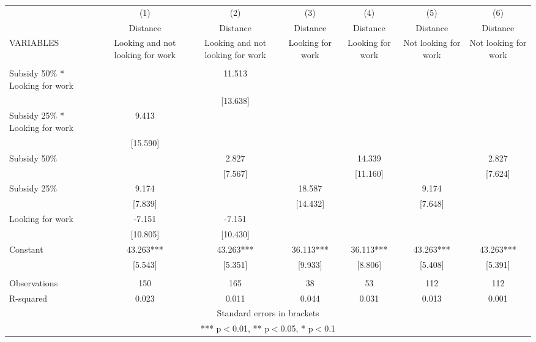 \documentclass[]{article}
\begin{document}
\begin{tabular}{lcccccc} \hline
 & (1) & (2) & (3) & (4) & (5) & (6) \\
 & Distance & Distance & Distance & Distance & Distance & Distance \\
VARIABLES & Looking and not looking for work & Looking and not looking for work & Looking for work & Looking for work & Not looking for work & Not looking for work \\ \hline
 &  &  &  &  &  &  \\
Subsidy 50\% * Looking for work &  & 11.513 &  &  &  &  \\
 &  & [13.638] &  &  &  &  \\
Subsidy 25\% * Looking for work & 9.413 &  &  &  &  &  \\
 & [15.590] &  &  &  &  &  \\
Subsidy 50\% &  & 2.827 &  & 14.339 &  & 2.827 \\
 &  & [7.567] &  & [11.160] &  & [7.624] \\
Subsidy 25\% & 9.174 &  & 18.587 &  & 9.174 &  \\
 & [7.839] &  & [14.432] &  & [7.648] &  \\
Looking for work & -7.151 & -7.151 &  &  &  &  \\
 & [10.805] & [10.430] &  &  &  &  \\
Constant & 43.263*** & 43.263*** & 36.113*** & 36.113*** & 43.263*** & 43.263*** \\
 & [5.543] & [5.351] & [9.933] & [8.806] & [5.408] & [5.391] \\
 &  &  &  &  &  &  \\
Observations & 150 & 165 & 38 & 53 & 112 & 112 \\
 R-squared & 0.023 & 0.011 & 0.044 & 0.031 & 0.013 & 0.001 \\ \hline
\multicolumn{7}{c}{ Standard errors in brackets} \\
\multicolumn{7}{c}{ *** p$<$0.01, ** p$<$0.05, * p$<$0.1} \\
\end{tabular}
\end{document}
